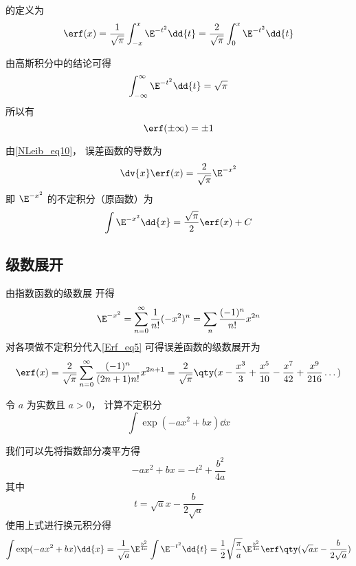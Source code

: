 
的定义为%
\begin{equation}\label{Erf_eq1}
\erf(x) = \frac{1}{\sqrt{\pi}} \int_{-x}^x \E^{-t^2} \dd{t}
= \frac{2}{\sqrt{\pi}} \int_{0}^x \E^{-t^2} \dd{t}
\end{equation}

由高斯积分中的结论可得
\begin{equation}
\int_{-\infty}^\infty \E^{-t^2} \dd{t} = \sqrt{\pi}
\end{equation}
所以有
\begin{equation}
\erf(\pm\infty) = \pm 1
\end{equation}

由\autoref{NLeib_eq10}， 误差函数的导数为
\begin{equation}
\dv{x} \erf(x) = \frac{2}{\sqrt{\pi}} \E^{-x^2}
\end{equation}
即 $\E^{-x^2}$ 的不定积分（原函数）为
\begin{equation}\label{Erf_eq5}
\int \E^{-x^2} \dd{x} = \frac{\sqrt{\pi}}{2} \erf(x) + C
\end{equation}

\subsection{级数展开}
由指数函数的级数展%
开得
\begin{equation}
\E^{-x^2} = \sum_{n=0}^\infty \frac{1}{n!} (-x^2)^n = \sum_n \frac{(-1)^n}{n!} x^{2n}
\end{equation}
对各项做不定积分代入\autoref{Erf_eq5} 可得误差函数的级数展开为
\begin{equation}
\erf(x) = \frac{2}{\sqrt{\pi}} \sum_{n=0}^\infty \frac{(-1)^n}{(2n+1)n!} x^{2n+1}
= \frac{2}{\sqrt{\pi}}\qty(x - \frac{x^3}{3} + \frac{x^5}{10} - \frac{x^7}{42} + \frac{x^9}{216} \dots)
\end{equation}

\begin{exam}{}\label{Erf_ex1}
令 $a$ 为实数且 $a > 0$， 计算不定积分
\begin{equation}
\int \exp(-ax^2 + bx) \dd{x}
\end{equation}

我们可以先将指数部分凑平方得
\begin{equation}
-ax^2 + bx = -t^2 + \frac{b^2}{4a}
\end{equation}
其中
\begin{equation}
t = \sqrt{a} x - \frac{b}{2\sqrt{a}} \qquad
\end{equation}
使用上式进行换元积分得
\begin{equation}
\int \exp(-ax^2 + bx) \dd{x} = \frac{1}{\sqrt{a}} \E^{\frac{b^2}{4a}} \int \E^{-t^2} \dd{t}
= \frac12 \sqrt{\frac{\pi}{a}} \E^{\frac{b^2}{4a}} \erf\qty(\sqrt{a} x - \frac{b}{2\sqrt{a}})
\end{equation}
\end{exam}

